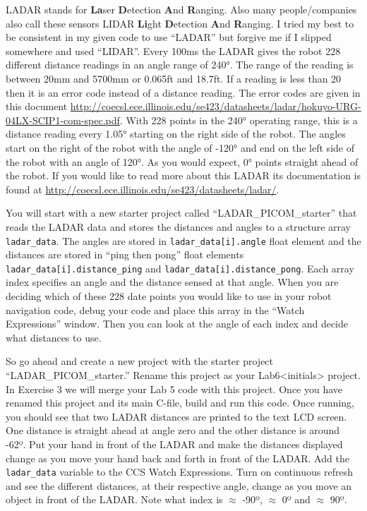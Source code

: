 \documentclass[11pt]{article}
\begin{document}
LADAR stands for \textbf{La}ser \textbf{D}etection \textbf{A}nd \textbf{R}anging. Also many people/companies also call these sensors LIDAR \textbf{Li}ght \textbf{D}etection \textbf{A}nd \textbf{R}anging. I tried my best to be consistent in my given code to use “LADAR” but forgive me if I slipped somewhere and used “LIDAR”. Every 100ms the LADAR gives the robot 228 different distance readings in an angle range of 240°. The range of the reading is between 20mm and 5700mm or 0.065ft and 18.7ft. If a reading is less than 20 then it is an error code instead of a distance reading. The error codes are given in this document \url{http://coecsl.ece.illinois.edu/se423/datasheets/ladar/hokuyo-URG-04LX-SCIP1-com-spec.pdf}. With 228 points in the 240° operating range, this is a distance reading every 1.05° starting on the right side of the robot. The angles start on the right of the robot with the angle of -120° and end on the left side of the robot with an angle of 120°. As you would expect, 0° points straight ahead of the robot. If you would like to read more about this LADAR its documentation is found at \url{http://coecsl.ece.illinois.edu/se423/datasheets/ladar/}.

You will start with a new starter project called “LADAR\_PICOM\_starter” that reads the LADAR data and stores the distances and angles to a structure array \texttt{ladar_data}. The angles are stored in \texttt{ladar_data[i].angle} float element and the distances are stored in “ping then pong” float elements \texttt{ladar_data[i].distance_ping} and \texttt{ladar_data[i].distance_pong}. Each array index specifies an angle and the distance sensed at that angle. When you are deciding which of these 228 date points you would like to use in your robot navigation code, debug your code and place this array in the “Watch Expressions” window. Then you can look at the angle of each index and decide what distances to use.

So go ahead and create a new project with the starter project “LADAR\_PICOM\_starter.” Rename this project as your Lab6<initials> project. In Exercise 3 we will merge your Lab 5 code with this project. Once you have renamed this project and its main C-file, build and run this code. Once running, you should see that two LADAR distances are printed to the text LCD screen. One distance is straight ahead at angle zero and the other distance is around -62º. Put your hand in front of the LADAR and make the distances displayed change as you move your hand back and forth in front of the LADAR. Add the \texttt{ladar_data} variable to the CCS Watch Expressions. Turn on continuous refresh and see the different distances, at their respective angle, change as you move an object in front of the LADAR. Note what index is $\approx$ -90º, $\approx$ 0º and $\approx$ 90º.
\end{document}
